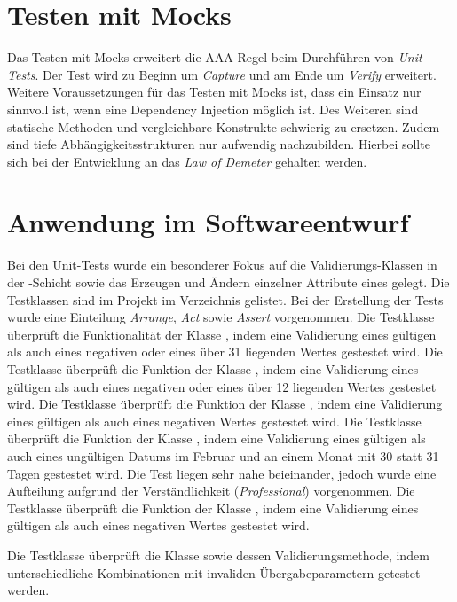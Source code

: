 \section{Testen mit Mocks}
Das Testen mit Mocks erweitert die AAA-Regel beim Durchführen von \textit{Unit Tests}.
Der Test wird zu Beginn um \textit{Capture} und am Ende um \textit{Verify} erweitert.
Weitere Voraussetzungen für das Testen mit Mocks ist, dass ein Einsatz nur sinnvoll ist, wenn eine Dependency Injection möglich ist.
Des Weiteren sind statische Methoden und vergleichbare Konstrukte schwierig zu ersetzen.
Zudem sind tiefe Abhängigkeitsstrukturen nur aufwendig nachzubilden.
Hierbei sollte sich bei der Entwicklung an das \textit{Law of Demeter} gehalten werden.

\section{Anwendung im Softwareentwurf}
Bei den Unit-Tests wurde ein besonderer Fokus auf die Validierungs-Klassen in der -Schicht sowie das Erzeugen und Ändern einzelner Attribute eines  gelegt.
Die Testklassen sind im Projekt im Verzeichnis  gelistet.
Bei der Erstellung der Tests wurde eine Einteilung \textit{Arrange}, \textit{Act} sowie \textit{Assert} vorgenommen.
Die Testklasse  überprüft die Funktionalität der Klasse , indem eine Validierung eines gültigen als auch eines negativen oder eines über 31 liegenden Wertes gestestet wird.
Die Testklasse  überprüft die Funktion der Klasse , indem eine Validierung eines gültigen als auch eines negativen oder eines über 12 liegenden Wertes gestestet wird.
Die Testklasse  überprüft die Funktion der Klasse , indem eine Validierung eines gültigen als auch eines negativen Wertes gestestet wird.
Die Testklasse  überprüft die Funktion der Klasse , indem eine Validierung eines gültigen als auch eines ungültigen Datums im Februar und an einem Monat mit 30 statt 31 Tagen gestestet wird.
Die Test liegen sehr nahe beieinander, jedoch wurde eine Aufteilung aufgrund der Verständlichkeit (\textit{Professional}) vorgenommen.
Die Testklasse  überprüft die Funktion der Klasse , indem eine Validierung eines gültigen als auch eines negativen Wertes gestestet wird.

Die Testklasse  überprüft die Klasse  sowie dessen Validierungsmethode, indem unterschiedliche Kombinationen mit invaliden Übergabeparametern getestet werden.


